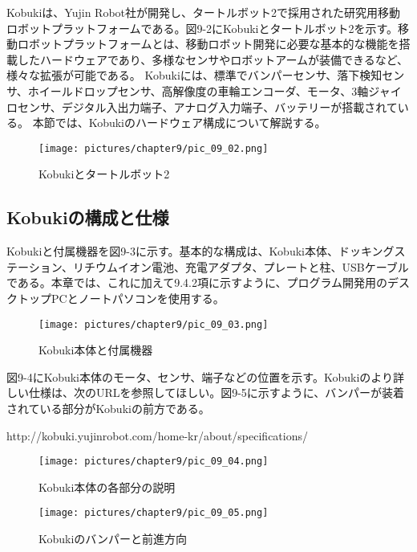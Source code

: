 Kobukiは、Yujin Robot社が開発し、タートルボット2で採用された研究用移動ロボットプラットフォームである。図9-2にKobukiとタートルボット2を示す。移動ロボットプラットフォームとは、移動ロボット開発に必要な基本的な機能を搭載したハードウェアであり、多様なセンサやロボットアームが装備できるなど、様々な拡張が可能である。  Kobukiには、標準でバンパーセンサ、落下検知センサ、ホイールドロップセンサ、高解像度の車輪エンコーダ、モータ、3軸ジャイロセンサ、デジタル入出力端子、アナログ入力端子、バッテリーが搭載されている。  本節では、Kobukiのハードウェア構成について解説する。

\begin{figure}[htp]
  \centering
  \texttt{[image: pictures/chapter9/pic\_09\_02.png]}
  \caption{Kobukiとタートルボット2}
\end{figure}


\subsection{Kobukiの構成と仕様}

Kobukiと付属機器を図9-3に示す。基本的な構成は、Kobuki本体、ドッキングステーション、リチウムイオン電池、充電アダプタ、プレートと柱、USBケーブルである。本章では、これに加えて9.4.2項に示すように、プログラム開発用のデスクトップPCとノートパソコンを使用する。

\begin{figure}[htp]
  \centering
  \texttt{[image: pictures/chapter9/pic\_09\_03.png]}
  \caption{Kobuki本体と付属機器}
\end{figure}


図9-4にKobuki本体のモータ、センサ、端子などの位置を示す。Kobukiのより詳しい仕様は、次のURLを参照してほしい。図9-5に示すように、バンパーが装着されている部分がKobukiの前方である。

http://kobuki.yujinrobot.com/home-kr/about/specifications/

\begin{figure}[htp]
  \centering
  \texttt{[image: pictures/chapter9/pic\_09\_04.png]}
  \caption{Kobuki本体の各部分の説明}
\end{figure}


\begin{figure}[htp]
  \centering
  \texttt{[image: pictures/chapter9/pic\_09\_05.png]}
  \caption{Kobukiのバンパーと前進方向}
\end{figure}

